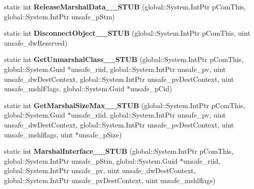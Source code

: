 \begin{DoxyCompactItemize}
static int {\bfseries Release\+Marshal\+Data\+\_\+\+\_\+\+S\+T\+UB} (global\+::\+System.\+Int\+Ptr p\+Com\+This, global\+::\+System.\+Int\+Ptr unsafe\+\_\+p\+Stm)
\item 
\mbox{\label{struct_system_1_1_runtime_1_1_interop_services_1_1_i_marshal_____system___runtime___windows_runtime_____impl_1_1_vtbl_a190a87511db9790b75721ec9fbbf6db5}} 
static int {\bfseries Disconnect\+Object\+\_\+\+\_\+\+S\+T\+UB} (global\+::\+System.\+Int\+Ptr p\+Com\+This, uint unsafe\+\_\+dw\+Reserved)
\item 
\mbox{\label{struct_system_1_1_runtime_1_1_interop_services_1_1_i_marshal_____system___runtime___windows_runtime_____impl_1_1_vtbl_a952344c0b9708ed27abae95ba1e22bc8}} 
static int {\bfseries Get\+Unmarshal\+Class\+\_\+\+\_\+\+S\+T\+UB} (global\+::\+System.\+Int\+Ptr p\+Com\+This, global\+::\+System.\+Guid $\ast$unsafe\+\_\+riid, global\+::\+System.\+Int\+Ptr unsafe\+\_\+pv, uint unsafe\+\_\+dw\+Dest\+Context, global\+::\+System.\+Int\+Ptr unsafe\+\_\+pv\+Dest\+Context, uint unsafe\+\_\+mshl\+Flags, global\+::\+System.\+Guid $\ast$unsafe\+\_\+p\+Cid)
\item 
\mbox{\label{struct_system_1_1_runtime_1_1_interop_services_1_1_i_marshal_____system___runtime___windows_runtime_____impl_1_1_vtbl_ae262511ad2d922da2fa5f9b7b21f17fa}} 
static int {\bfseries Get\+Marshal\+Size\+Max\+\_\+\+\_\+\+S\+T\+UB} (global\+::\+System.\+Int\+Ptr p\+Com\+This, global\+::\+System.\+Guid $\ast$unsafe\+\_\+riid, global\+::\+System.\+Int\+Ptr unsafe\+\_\+pv, uint unsafe\+\_\+dw\+Dest\+Context, global\+::\+System.\+Int\+Ptr unsafe\+\_\+pv\+Dest\+Context, uint unsafe\+\_\+mshlflags, uint $\ast$unsafe\+\_\+p\+Size)
\item 
\mbox{\label{struct_system_1_1_runtime_1_1_interop_services_1_1_i_marshal_____system___runtime___windows_runtime_____impl_1_1_vtbl_a8ca757bdde9525e1da4e2ba60a35ffd6}} 
static int {\bfseries Marshal\+Interface\+\_\+\+\_\+\+S\+T\+UB} (global\+::\+System.\+Int\+Ptr p\+Com\+This, global\+::\+System.\+Int\+Ptr unsafe\+\_\+p\+Stm, global\+::\+System.\+Guid $\ast$unsafe\+\_\+riid, global\+::\+System.\+Int\+Ptr unsafe\+\_\+pv, uint unsafe\+\_\+dw\+Dest\+Context, global\+::\+System.\+Int\+Ptr unsafe\+\_\+pv\+Dest\+Context, uint unsafe\+\_\+mshlflags)

\end{DoxyCompactItemize}
